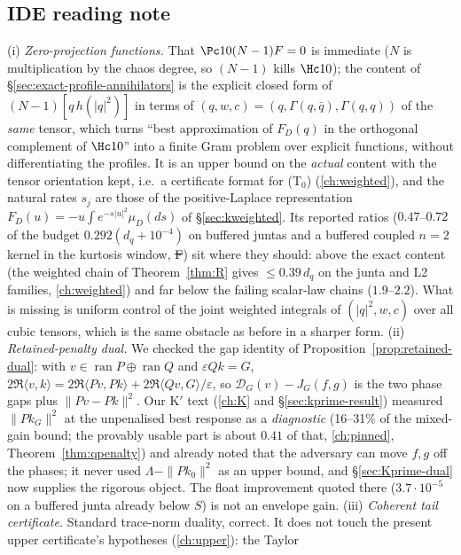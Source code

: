 \subsection{IDE reading note}\label{sec:crossbound-reading}
(i) \emph{Zero-projection functions.} That $\Pc10(N-1)F=0$ is immediate ($N$ is multiplication by the chaos degree, so $(N-1)$ kills $\Hc10$); the content of
\S\ref{sec:exact-profile-annihilators} is the explicit closed form of $(N-1)[q\,h(|q|^2)]$ in terms of $(q,w,c)=(q,\Gamma(q,\bar q),\Gamma(q,q))$ of the \emph{same} tensor, which turns
``best approximation of $F_D(q)$ in the orthogonal complement of $\Hc10$'' into a finite Gram problem over explicit functions, without differentiating the profiles. It is an
upper bound on the \emph{actual} content with the tensor orientation kept, i.e.\ a certificate format for (T$_0$) (\autoref{ch:weighted}), and the natural rates $s_j$ are those of the
positive-Laplace representation $F_D(u)=-u\int e^{-s|u|^2}\mu_D(ds)$ of \S\ref{sec:kweighted}. Its reported ratios ($0.47$--$0.72$ of the budget $0.292(d_q+10^{-4})$ on buffered juntas and
a buffered coupled $n=2$ kernel in the kurtosis window, \st{F}) sit where they should: above the exact content (the weighted chain of Theorem~\ref{thm:R} gives $\le0.39\,d_q$ on the
junta and L2 families, \autoref{ch:weighted}) and far below the failing scalar-law chains ($1.9$--$2.2$). What is missing is uniform control of the joint weighted integrals of
$(|q|^2,w,c)$ over all cubic tensors, which is the same obstacle as before in a sharper form.
(ii) \emph{Retained-penalty dual.} We checked the gap identity of Proposition~\ref{prop:retained-dual}: with $v\in\operatorname{ran}P\oplus\operatorname{ran}Q$ and $\varepsilon Qk=G$,
$2\Re\langle v,k\rangle=2\Re\langle Pv,Pk\rangle+2\Re\langle Qv,G\rangle/\varepsilon$, so $\mathcal D_G(v)-J_G(f,g)$ is the two phase gaps plus $\|Pv-Pk\|^2$. Our K$'$ text (\autoref{ch:K} and
\S\ref{sec:kprime-result}) measured $\|Pk_G\|^2$ at the unpenalised best response as a \emph{diagnostic} (16--31\% of the mixed-gain bound; the provably usable part is about $0.41$ of that, \autoref{ch:pinned}, Theorem~\ref{thm:qpenalty}) and already noted that the adversary can
move $f,g$ off the phases; it never used $\Lambda-\|Pk_0\|^2$ as an upper bound, and \S\ref{sec:Kprime-dual} now supplies the rigorous object. The float improvement quoted there
($3.7\cdot10^{-5}$ on a buffered junta already below $S$) is not an envelope gain.
(iii) \emph{Coherent tail certificate.} Standard trace-norm duality, correct. It does not touch the present upper certificate's hypotheses (\autoref{ch:upper}): the Taylor
